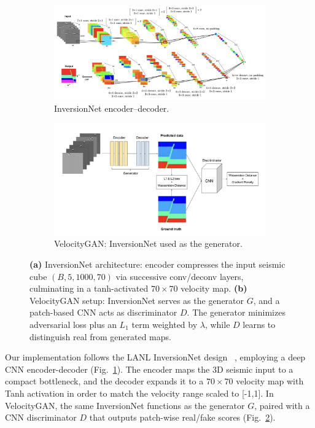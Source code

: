 \documentclass{article}
\begin{document}
\begin{figure}
    \centering
    \begin{subfigure}[b]{0.48\linewidth}
      \centering
      \includegraphics[width=\linewidth]{figures/InversionNet.png}
      \caption{InversionNet encoder–decoder.}
      \label{fig:inversionnet_sub}
    \end{subfigure}
    \hfill
    \begin{subfigure}[b]{0.48\linewidth}
      \centering
      \includegraphics[width=\linewidth]{figures/VelocityGAN.png}
      \caption{VelocityGAN: InversionNet used as the generator.}
      \label{fig:velocitygan_sub}
    \end{subfigure}
    \caption{\textbf{(a)} InversionNet architecture: encoder compresses the input seismic cube $(B,5,1000,70)$ via successive conv/deconv layers, culminating in a tanh-activated $70\times70$ velocity map. \textbf{(b)} VelocityGAN setup: InversionNet serves as the generator $G$, and a patch-based CNN acts as discriminator $D$. The generator minimizes adversarial loss plus an $L_1$ term weighted by $\lambda$, while $D$ learns to distinguish real from generated maps.}
    \label{fig:inversion_velocitygan}
  \end{figure}
  
  Our implementation follows the LANL InversionNet design ~\cite{inversionnet, velocitygan}, employing a deep CNN encoder-decoder (Fig.~\ref{fig:inversionnet_sub}). The encoder maps the 3D seismic input to a compact bottleneck, and the decoder expands it to a $70\times70$ velocity map with Tanh activation in order to match the velocity range scaled to [-1,1]. In VelocityGAN, the same InversionNet functions as the generator $G$, paired with a CNN discriminator $D$ that outputs patch-wise real/fake scores (Fig.~\ref{fig:velocitygan_sub}).
  
\end{document}
